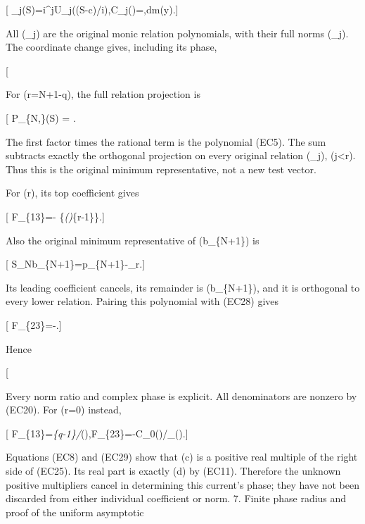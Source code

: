{[} \pi\_j(S)=i\^{}jU\_j((S-c)/i),\qquad C\_j(\lambda)=\int {},dm(y).{]}

All (\pi\_j) are the original monic relation polynomials, with their full norms (\nu\_j). The coordinate change gives, including its phase,

{[}  \tag{EC27}{]}

For (r=N+1-q), the full relation projection is

{[} P\_\{N,\lambda\}(S) = \left[
\frac1{S-\lambda}
-\sum_{j=0}^{r-1}\frac{C_j(\lambda)}{\nu_j}\pi_j(S)
\right]. \tag{EC28}{]}

The first factor times the rational term is the polynomial (EC5). The sum subtracts exactly the orthogonal projection on every original relation (\chi\pi\_j), (j\textless r). Thus this is the original minimum representative, not a new test vector.

For (r), its top coefficient gives

{[} F\_\{13\}=- \{\chi\emph{\lambda(\lambda)\nu}\{r-1\}\}.{]}

Also the original minimum representative of (b\_\{N+1\}) is

{[} \mathscr S\_Nb\_\{N+1\}=p\_\{N+1\}-\chi\pi\_r.{]}

Its leading coefficient cancels, its remainder is (b\_\{N+1\}), and it is orthogonal to every lower relation. Pairing this polynomial with (EC28) gives

{[} F\_\{23\}=-.{]}

Hence

{[}  \tag{EC29}{]}

Every norm ratio and complex phase is explicit. All denominators are nonzero by (EC20). For (r=0) instead,

{[} F\_\{13\}=\omega\emph{\{q-1\}/\chi}\lambda(\lambda),\qquad F\_\{23\}=-C\_0(\lambda)/\chi\_\lambda(\lambda).{]}

Equations (EC8) and (EC29) show that (\mathfrak c) is a positive real multiple of the right side of (EC25). Its real part is exactly (d) by (EC11). Therefore the unknown positive multipliers cancel in determining this current's phase; they have not been discarded from either individual coefficient or norm. 7. Finite phase radius and proof of the uniform asymptotic

